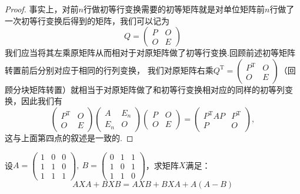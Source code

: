 \begin{enumerate}
    \begin{proof}
        事实上，对前$n$行做初等行变换需要的初等矩阵就是对单位矩阵前$n$行做了一次初等行变换后得到的矩阵，我们可以记为
        \[Q=\begin{pmatrix}
            P & O \\ O & E
        \end{pmatrix}\]
        我们应当将其左乘原矩阵从而相对于对原矩阵做了初等行变换.回顾前述初等矩阵转置前后分别对应于相同的行列变换，
        我们对原矩阵右乘$Q^{\mathrm{T}}=\begin{pmatrix}
            P^\mathrm{T} & O \\ O & E
        \end{pmatrix}$（回顾分块矩阵转置）就相当于对原矩阵做了和初等行变换相对应的同样的初等列变换，因此我们有
        \[\begin{pmatrix}
            P^\mathrm{T} & O \\ O & E
        \end{pmatrix}\begin{pmatrix}
            A & E_n \\ E_n & O
        \end{pmatrix}\begin{pmatrix}
            P & O \\ O & E
        \end{pmatrix}=\begin{pmatrix}
            P^\mathrm{T}AP & P^\mathrm{T} \\ P & O
        \end{pmatrix}
        ,\]
        这与上面第四点的叙述是一致的.
    \end{proof}
\end{enumerate}

\begin{example}
    设$A=\begin{pmatrix}1 & 0 & 0 \\ 1 & 1 & 0 \\ 1 & 1 & 1\end{pmatrix},\
    B=\begin{pmatrix}0 & 1 & 1 \\ 1 & 0 & 1 \\ 1 & 1 & 0\end{pmatrix}$，求矩阵$X$满足：
    \[AXA+BXB=AXB+BXA+A(A-B)\]
\end{example}
\begin{solution}

\end{solution}

